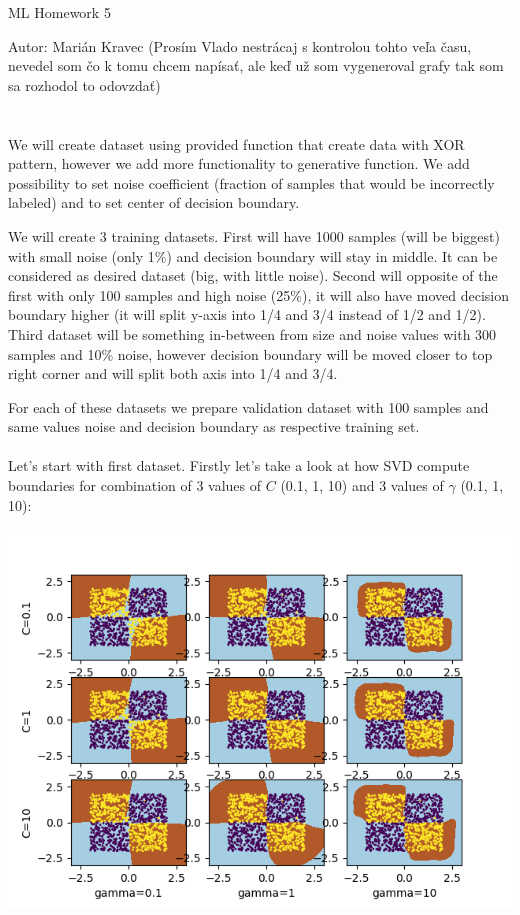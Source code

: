 \documentclass[a4paper]{article}
\begin{document}
 
	
	\pagestyle{plain}
	
	\begin{center}
		\sc\large
		ML Homework 5
		
	\end{center}
	Autor: Marián Kravec
	(Prosím Vlado nestrácaj s kontrolou tohto veľa času, nevedel som čo k tomu chcem napísať, ale keď už som vygeneroval grafy tak som sa rozhodol to odovzdať)
	\\
	\\
	\\
	We will create dataset using provided function that create data with XOR pattern, however we add more functionality to generative function. We add possibility to set noise coefficient (fraction of samples that would be incorrectly labeled) and to set center of decision boundary.
	
	We will create 3 training datasets. First will have 1000 samples (will be biggest) with small noise (only 1\%) and decision boundary will stay in middle. It can be considered as desired dataset (big, with little noise). Second will opposite of the first with only 100 samples and high noise (25\%), it will also have moved decision boundary higher (it will split  y-axis into 1/4 and 3/4 instead of 1/2 and 1/2). Third dataset will be something in-between from size and noise values with 300 samples and 10\% noise, however  decision boundary will be moved closer to top right corner and will split both axis into 1/4 and 3/4.
	
	For each of these datasets we prepare validation dataset with 100 samples and same values noise and  decision boundary as respective training set. 
	\\
	\\
	Let's start with first dataset. Firstly let's take a look at how SVD compute boundaries for combination of 3 values of $C$ (0.1, 1, 10) and 3 values of $\gamma$ (0.1, 1, 10):
	
	\centerline{\includegraphics[width=1.1\textwidth]{dataset_1_diff_c_gamma}}
	
\end{document}
